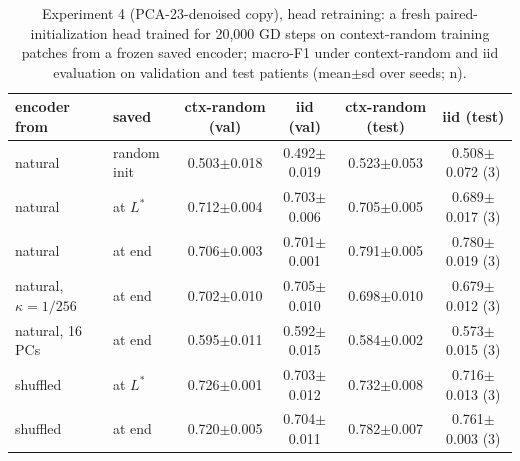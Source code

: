 \begin{table}[htbp]\centering\scriptsize
\caption{Experiment 4 (PCA-23-denoised copy), head retraining: a fresh paired-initialization head trained for 20{,}000 GD steps on context-random training patches from a frozen saved encoder; macro-F1 under context-random and iid evaluation on validation and test patients (mean$\pm$sd over seeds; n).}\label{tab:exp4_recovery_pca23}
\begin{tabular}{llcccc}\toprule
encoder from & saved & ctx-random (val) & iid (val) & ctx-random (test) & iid (test) \\ \midrule
natural & random init & 0.503$\pm$0.018 & 0.492$\pm$0.019 & 0.523$\pm$0.053 & 0.508$\pm$0.072 (3) \\
natural & at $L^\ast$ & 0.712$\pm$0.004 & 0.703$\pm$0.006 & 0.705$\pm$0.005 & 0.689$\pm$0.017 (3) \\
natural & at end & 0.706$\pm$0.003 & 0.701$\pm$0.001 & 0.791$\pm$0.005 & 0.780$\pm$0.019 (3) \\
natural, $\kappa=1/256$ & at end & 0.702$\pm$0.010 & 0.705$\pm$0.010 & 0.698$\pm$0.010 & 0.679$\pm$0.012 (3) \\
natural, 16 PCs & at end & 0.595$\pm$0.011 & 0.592$\pm$0.015 & 0.584$\pm$0.002 & 0.573$\pm$0.015 (3) \\
shuffled & at $L^\ast$ & 0.726$\pm$0.001 & 0.703$\pm$0.012 & 0.732$\pm$0.008 & 0.716$\pm$0.013 (3) \\
shuffled & at end & 0.720$\pm$0.005 & 0.704$\pm$0.011 & 0.782$\pm$0.007 & 0.761$\pm$0.003 (3) \\
\bottomrule\end{tabular}\end{table}
